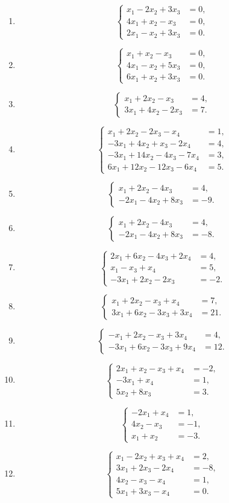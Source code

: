 \documentclass[12pt]{article}
\newcommand{\sistema}[1]{%
\[
\left\{
\begin{aligned}
#1
\end{aligned}
\right.
\]
}
\begin{document}
\begin{enumerate}[label=\textbf{\arabic*.},leftmargin=*]
\item \sistema{
x_1-2x_2+3x_3&=0,\\
4x_1+x_2-x_3&=0,\\
2x_1-x_2+3x_3&=0.
}

\item \sistema{
x_1+x_2-x_3&=0,\\
4x_1-x_2+5x_3&=0,\\
6x_1+x_2+3x_3&=0.
}

\item \sistema{
x_1+2x_2-x_3&=4,\\
3x_1+4x_2-2x_3&=7.
}

\item \sistema{
x_1+2x_2-2x_3-x_4&=1,\\
-3x_1+4x_2+x_3-2x_4&=4,\\
-3x_1+14x_2-4x_3-7x_4&=3,\\
6x_1+12x_2-12x_3-6x_4&=5.
}

\item \sistema{
x_1+2x_2-4x_3&=4,\\
-2x_1-4x_2+8x_3&=-9.
}

\item \sistema{
x_1+2x_2-4x_3&=4,\\
-2x_1-4x_2+8x_3&=-8.
}

\item \sistema{
2x_1+6x_2-4x_3+2x_4&=4,\\
x_1-x_3+x_4&=5,\\
-3x_1+2x_2-2x_3&=-2.
}

\item \sistema{
x_1+2x_2-x_3+x_4&=7,\\
3x_1+6x_2-3x_3+3x_4&=21.
}

\item \sistema{
-x_1+2x_2-x_3+3x_4&=4,\\
-3x_1+6x_2-3x_3+9x_4&=12.
}

\item \sistema{
2x_1+x_2-x_3+x_4&=-2,\\
-3x_1+x_4&=1,\\
5x_2+8x_3&=3.
}

\item \sistema{
-2x_1+x_4&=1,\\
4x_2-x_3&=-1,\\
x_1+x_2&=-3.
}

\item \sistema{
x_1-2x_2+x_3+x_4&=2,\\
3x_1+2x_3-2x_4&=-8,\\
4x_2-x_3-x_4&=1,\\
5x_1+3x_3-x_4&=0.
}


\end{enumerate}
\end{document}
